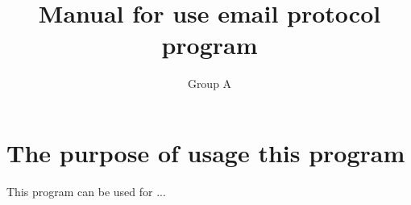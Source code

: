 \documentclass{article}
\title{Manual for use email protocol program}
\author{Group A}
\date{}
\begin{document}
\maketitle

\section{The purpose of usage this program}
This program can be used for ...
\end{document}
